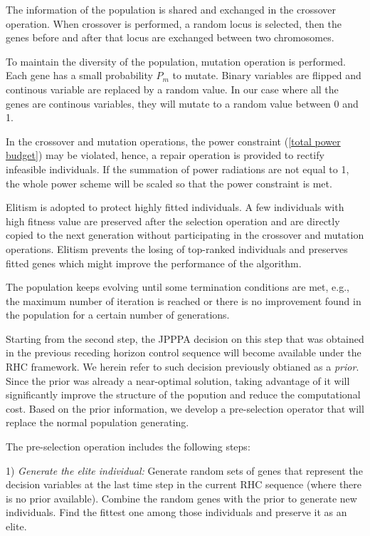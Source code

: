 \documentclass[12pt,journal,draftclsnofoot,onecolumn]{IEEEtran}
\begin{document}
The information of the population is shared and exchanged in the crossover operation. When crossover is performed, a random locus is selected, then the genes before and after that locus are exchanged between two chromosomes. 

To maintain the diversity of the population, mutation operation is performed. Each gene has a small probability $P_m$ to mutate. Binary variables are flipped and continous variable are replaced by a random value. In our case where all the genes are continous variables, they will mutate to a random value between 0 and 1.

In the crossover and mutation operations, the power constraint (\ref{total power budget}) may be violated, hence, a repair operation is provided to rectify infeasible individuals. If the summation of power radiations are not equal to 1, the whole power scheme will be scaled so that the power constraint is met.

Elitism is adopted to protect highly fitted individuals. A few individuals with high fitness value are preserved after the selection operation and are directly copied to the next generation without participating in the crossover and mutation operations. Elitism prevents the losing of top-ranked individuals and preserves fitted genes which might improve the performance of the algorithm.

The population keeps evolving until some termination conditions are met, e.g., the maximum number of iteration is reached or there is no improvement found in the population for a certain number of generations.

Starting from the second step, the JPPPA decision on this step that was obtained in the previous receding horizon control sequence will become available under the RHC framework. We herein refer to such decision previously obtianed as a \emph{prior}. Since the prior was already a near-optimal solution, taking advantage of it will significantly improve the structure of the popution and reduce the computational cost.
Based on the prior information, we develop a pre-selection operator that will replace the normal population generating.

The pre-selection operation includes the following steps:

1) \emph{Generate the elite individual:} Generate random sets of genes that represent the decision variables at the last time step in the current RHC sequence (where there is no prior available). Combine the random genes with the prior to generate new individuals. Find the fittest one among those individuals and preserve it as an elite.
\end{document}
